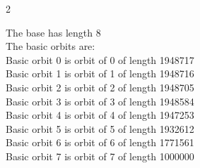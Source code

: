 \begin{multicols}{2}


\bigskip
The base has length 8\\
The basic orbits are: \\
Basic orbit 0 is orbit of 0 of length 1948717\\
Basic orbit 1 is orbit of 1 of length 1948716\\
Basic orbit 2 is orbit of 2 of length 1948705\\
Basic orbit 3 is orbit of 3 of length 1948584\\
Basic orbit 4 is orbit of 4 of length 1947253\\
Basic orbit 5 is orbit of 5 of length 1932612\\
Basic orbit 6 is orbit of 6 of length 1771561\\
Basic orbit 7 is orbit of 7 of length 1000000\\
\end{multicols}
